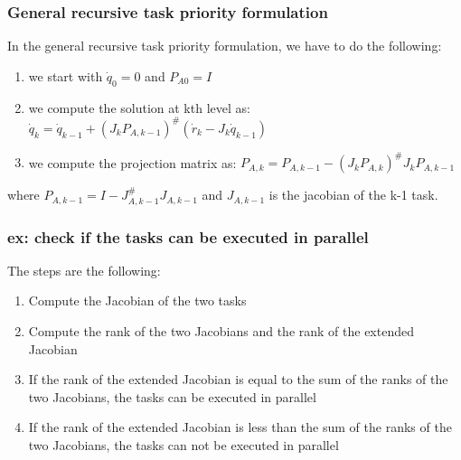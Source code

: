 \documentclass[a4paper,12pt]{article}
\begin{document}
\subsubsection{General recursive task priority formulation}
In the general recursive task priority formulation, we have to do the following:
\begin{enumerate}
    \item we start with $\dot{q}_0 = 0$ and $P_{A0}=I$
    \item we compute the solution at kth level as: 
    $\dot{q}_k = \dot{q}_{k-1} + (J_k P_{A,k-1})^{\#}(\dot{r}_k - J_k \dot{q}_{k-1})$
    \item we compute the projection matrix as: $P_{A,k} = P_{A,k-1} - (J_kP_{A,k})^{\#} J_k P_{A,k-1}$
\end{enumerate}
where $P_{A,k-1} = I - J_{A,k-1}^{\#} J_{A,k-1}$ and $J_{A,k-1}$ is the jacobian of the k-1 task.
\subsubsection{ex: check if the tasks can be executed in parallel}
The steps are the following:
\begin{enumerate}
    \item Compute the Jacobian of the two tasks
    \item Compute the rank of the two Jacobians and the rank of the extended Jacobian
    \item If the rank of the extended Jacobian is equal to the sum of the ranks of the two Jacobians,
        the tasks can be executed in parallel
    \item If the rank of the extended Jacobian is less than the sum of the ranks of the two Jacobians,
        the tasks can not be executed in parallel
\end{enumerate}
\end{document}
